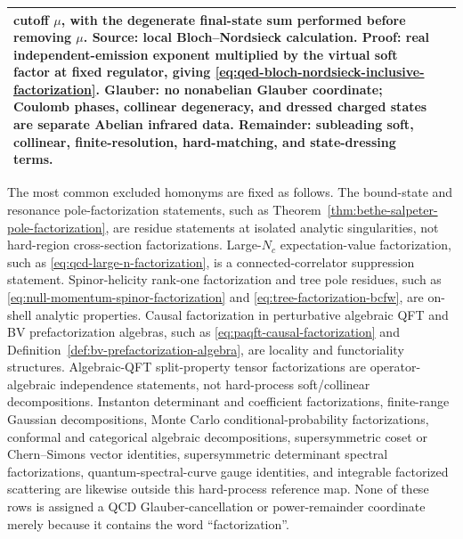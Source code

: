 {\begin{longtable}{@{}>{\raggedright\arraybackslash}p{}>{\raggedright\arraybackslash}p{}@{}}
cutoff \(\mu\), with the degenerate final-state sum performed before removing
\(\mu\).  Source: local Bloch--Nordsieck calculation.  Proof: real
independent-emission exponent multiplied by the virtual soft factor at fixed
regulator, giving \eqref{eq:qed-bloch-nordsieck-inclusive-factorization}.
Glauber: no nonabelian Glauber coordinate; Coulomb phases, collinear
degeneracy, and dressed charged states are separate Abelian infrared data.
Remainder: subleading soft, collinear, finite-resolution, hard-matching, and
state-dressing terms.
\\ \hline
\end{longtable}
}

The most common excluded homonyms are fixed as follows.  The bound-state and
resonance pole-factorization statements, such as
Theorem~\ref{thm:bethe-salpeter-pole-factorization}, are residue statements at
isolated analytic singularities, not hard-region cross-section factorizations.
Large-\(N_c\) expectation-value factorization, such as
\eqref{eq:qcd-large-n-factorization}, is a connected-correlator suppression
statement.  Spinor-helicity rank-one factorization and tree pole residues, such
as \eqref{eq:null-momentum-spinor-factorization} and
\eqref{eq:tree-factorization-bcfw}, are on-shell analytic properties.  Causal
factorization in perturbative algebraic QFT and BV prefactorization algebras,
such as \eqref{eq:paqft-causal-factorization} and
Definition~\ref{def:bv-prefactorization-algebra}, are locality and
functoriality structures.  Algebraic-QFT split-property tensor
factorizations are operator-algebraic independence statements, not
hard-process soft/collinear decompositions.  Instanton determinant and coefficient
factorizations, finite-range Gaussian decompositions, Monte Carlo
conditional-probability factorizations, conformal and categorical algebraic
decompositions, supersymmetric coset or Chern--Simons vector identities,
supersymmetric determinant spectral factorizations, quantum-spectral-curve
gauge identities, and integrable factorized scattering are likewise outside
this hard-process reference map.  None of these rows is assigned a QCD
Glauber-cancellation or power-remainder coordinate merely because it contains
the word ``factorization''.

